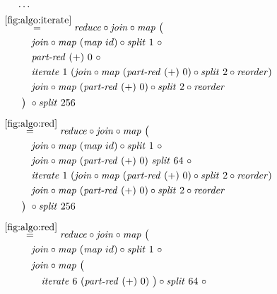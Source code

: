 \begin{figure*}[t]
\begin{align*}
  &\hspace{.5em}\ldots\\
%
  &\hspace{-2em}\quad\begin{aligned}
    &\overset{\ref{fig:algo:iterate}}{=\hspace{.2em}}
      \reduce \circ \join \circ \map\ \big(\\
    &\qquad\quad\join \circ \map\ (\map\ id) \circ \splitN\ 1\ \circ\\
    &\qquad\quad\partRed\ (+)\ 0\ \circ\\
    &\qquad\quad\iterateN\ 1\ (\join \circ \map\ (\partRed\ (+)\ 0) \circ \splitN\ 2\circ \reorder)\\
    &\qquad\quad\join \circ \map\ (\partRed\ (+)\ 0) \circ \splitN\ 2\circ \reorder\\
    &\qquad\big)\ \circ \splitN\ 256
  \end{aligned}\\[.5em]
%
  &\hspace{-2em}\quad\begin{aligned}
    &\overset{\ref{fig:algo:red}}{=\hspace{.2em}}
      \reduce \circ \join \circ \map\ \big(\\
    &\qquad\quad\join \circ \map\ (\map\ id) \circ \splitN\ 1\ \circ\\
    &\qquad\quad\join \circ \map\ (\partRed\ (+)\ 0)\ \splitN\ 64\ \circ\\
    &\qquad\quad\iterateN\ 1\ (\join \circ \map\ (\partRed\ (+)\ 0) \circ \splitN\ 2\circ \reorder)\\
    &\qquad\quad\join \circ \map\ (\partRed\ (+)\ 0) \circ \splitN\ 2\circ \reorder\\
    &\qquad\big)\ \circ \splitN\ 256
  \end{aligned}\\[.5em]
%
  &\hspace{-2em}\quad\begin{aligned}
    &\overset{\ref{fig:algo:red}}{=\hspace{.2em}}
      \reduce \circ \join \circ \map\ \big(\\
    &\qquad\quad\join \circ \map\ (\map\ id) \circ \splitN\ 1\ \circ\\
    &\qquad\quad\join \circ \map\ \big(\\
    &\qquad\qquad \iterateN\ 6\ (\partRed\ (+)\ 0)\ \big)\circ \splitN\ 64\ \circ\\

\end{aligned}
\end{align*}
\end{figure*}
